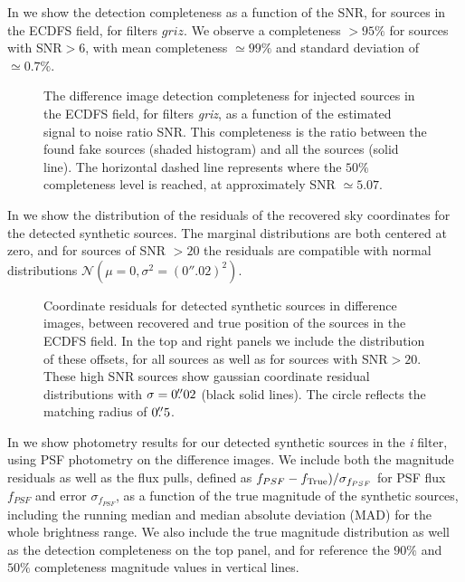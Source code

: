 In  we show the detection completeness as a function of the \gls{SNR}, for sources in the \gls{ECDFS} field, for filters $griz$. 
We observe a completeness $>95\%$ for sources with \gls{SNR}$> 6$, with mean completeness $\simeq 99\%$ and standard deviation of $\simeq 0.7\%$.
%
\begin{figure}[htb!]
\caption{The difference image detection completeness for injected sources in the \gls{ECDFS} field, for filters \textit{griz}, as a function of the estimated signal to noise ratio SNR. 
This completeness is the ratio between the found fake sources (shaded histogram) and all the sources (solid line). 
The horizontal dashed line represents where the $50\%$ completeness level is reached, at approximately SNR $\simeq 5.07$.}
\label{fig:eff_snr_griz}
\end{figure}
%
In  we show the distribution of the residuals of the recovered sky coordinates for the detected synthetic sources. The marginal distributions are both centered at zero, and for sources of SNR $>20$ the residuals are compatible with normal distributions $\mathcal{N}(\mu=0, \sigma^2=(0''.02)^2)$.
%
\begin{figure}[htb!]
\caption{Coordinate residuals for detected synthetic sources in difference images, between recovered and true position of the sources in the \gls{ECDFS} field. 
In the top and right panels we include the distribution of these offsets, for all sources as well as for sources with SNR$>20$. 
These high SNR sources show gaussian coordinate residual distributions with $\sigma=0\mbox{$.\!\!^{\prime\prime}$}02$ (black solid lines). 
The circle reflects the matching radius of $0\mbox{$.\!\!^{\prime\prime}$}5$.}
\label{fig:coordinate_offset_diffim_fakes}
\end{figure}
%
In  we show photometry results for our detected synthetic sources in the \textit{i} filter, using \gls{PSF} photometry on the difference images. 
We include both the magnitude residuals as well as the flux pulls, defined as $f_{PSF}-f_{\rm{True}})/\sigma_{f_{PSF}}$ for PSF \gls{flux} $f_{PSF}$ and error $\sigma_{f_{PSF}}$,  
as a function of the true magnitude of the synthetic sources, including the running median and median absolute deviation (MAD) for the whole brightness range. 
We also include the true magnitude distribution as well as the detection completeness on the top panel, and for reference the $90\%$ and $50\%$ completeness magnitude values in vertical lines. 
